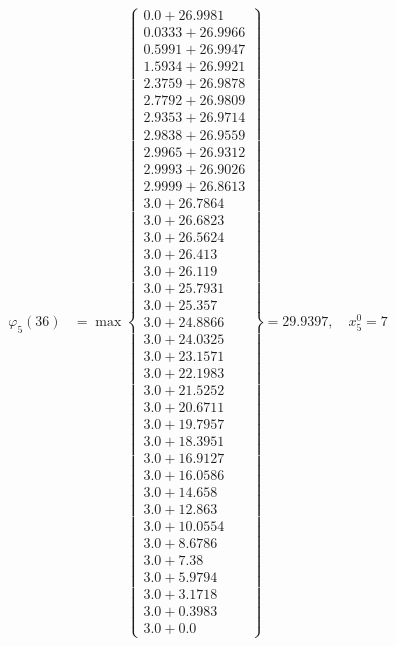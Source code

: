 \documentclass{article}
\begin{document}
\begin{align*}
\varphi_{5}(36) &= \max \left\{ \begin{array}{c}
0.0 + 26.9981 \\
 0.0333 + 26.9966 \\
 0.5991 + 26.9947 \\
 1.5934 + 26.9921 \\
 2.3759 + 26.9878 \\
 2.7792 + 26.9809 \\
 2.9353 + 26.9714 \\
 2.9838 + 26.9559 \\
 2.9965 + 26.9312 \\
 2.9993 + 26.9026 \\
 2.9999 + 26.8613 \\
 3.0 + 26.7864 \\
 3.0 + 26.6823 \\
 3.0 + 26.5624 \\
 3.0 + 26.413 \\
 3.0 + 26.119 \\
 3.0 + 25.7931 \\
 3.0 + 25.357 \\
 3.0 + 24.8866 \\
 3.0 + 24.0325 \\
 3.0 + 23.1571 \\
 3.0 + 22.1983 \\
 3.0 + 21.5252 \\
 3.0 + 20.6711 \\
 3.0 + 19.7957 \\
 3.0 + 18.3951 \\
 3.0 + 16.9127 \\
 3.0 + 16.0586 \\
 3.0 + 14.658 \\
 3.0 + 12.863 \\
 3.0 + 10.0554 \\
 3.0 + 8.6786 \\
 3.0 + 7.38 \\
 3.0 + 5.9794 \\
 3.0 + 3.1718 \\
 3.0 + 0.3983 \\
 3.0 + 0.0
\end{array} \right\}=29.9397, \quad x_{5}^0=7\\
  
 \\ 
\end{align*}
\end{document}
